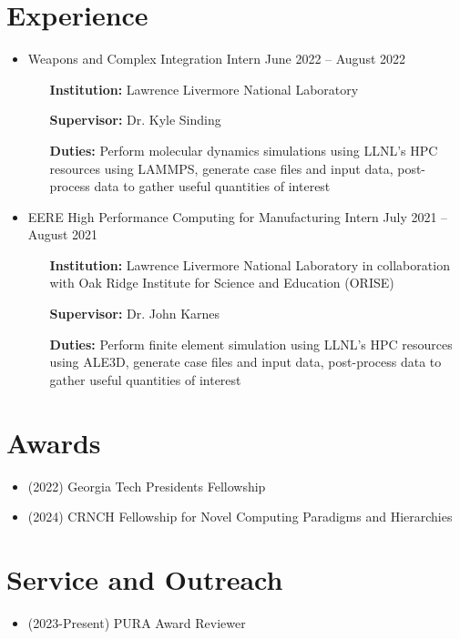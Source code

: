 \documentclass{article}
\begin{document}
\section{Experience}
\begin{itemize}
    \item Weapons and Complex Integration Intern \hfill June 2022 -- August 2022
    \begin{itemize}[leftmargin=0.875in]
        \setlength\itemsep{-0.3em}
        \item[\textbf{Institution:}] Lawrence Livermore National Laboratory
        \item[\textbf{Supervisor:}] Dr. Kyle Sinding
        \item[\textbf{Duties:}] Perform molecular dynamics simulations using LLNL's HPC resources using LAMMPS, generate case files and input data, post-process data to gather useful quantities of interest
    \end{itemize}
    \item  EERE High Performance Computing for Manufacturing Intern \hfill July 2021 -- August 2021
    \begin{itemize}[leftmargin=0.875in]
        \setlength\itemsep{-0.3em}
        \item[\textbf{Institution:}] Lawrence Livermore National Laboratory in collaboration with Oak Ridge Institute for Science and Education (ORISE)
        \item[\textbf{Supervisor:}] Dr. John Karnes
        \item[\textbf{Duties:}] Perform finite element simulation using LLNL's HPC resources using ALE3D, generate case files and input data, post-process data to gather useful quantities of interest 
    \end{itemize}
\end{itemize}

\section{Awards}
\begin{itemize}
    \item (2022) Georgia Tech Presidents Fellowship
    \item (2024) CRNCH Fellowship for Novel Computing Paradigms and Hierarchies
\end{itemize}

\section{Service and Outreach}
\begin{itemize}
    \item (2023-Present) PURA Award Reviewer
\end{itemize}
\end{document}
